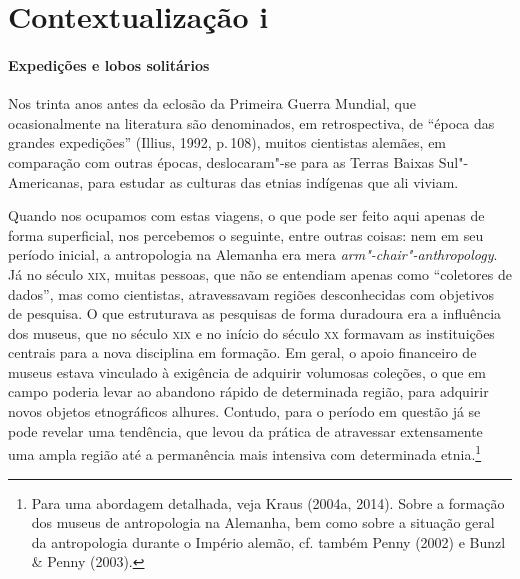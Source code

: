 \section{Contextualização i}
\paragraph{Expedições e lobos solitários} Nos trinta anos antes da eclosão da Primeira Guerra Mundial, que
ocasionalmente na literatura são denominados, em retrospectiva, de
``época das grandes expedições'' (Illius, 1992, p.\,108), muitos
cientistas alemães, em comparação com outras épocas, deslocaram"-se para
as Terras Baixas Sul"-Americanas, para estudar as culturas das etnias
indígenas que ali viviam.

Quando nos ocupamos com estas viagens, o que pode ser feito aqui apenas
de forma superficial, nos percebemos o seguinte, entre outras coisas:
nem em seu período inicial, a antropologia na Alemanha era mera
\textit{arm"-chair"-anthropology}. Já no século \textsc{xix}, muitas pessoas, que não
se entendiam apenas como ``coletores de dados'', mas como cientistas,
atravessavam regiões desconhecidas com objetivos de pesquisa. O que
estruturava as pesquisas de forma duradoura era a influência dos
museus, que no século \textsc{xix} e no início do século \textsc{xx} formavam as
instituições centrais para a nova disciplina em formação. Em geral, o
apoio financeiro de museus estava vinculado à exigência de adquirir
volumosas coleções, o que em campo poderia levar ao abandono rápido de
determinada região, para adquirir novos objetos etnográficos alhures.
Contudo, para o período em questão já se pode revelar uma tendência, que
levou da prática de atravessar extensamente uma ampla região até a
permanência mais intensiva com determinada etnia.\footnote{Para uma
  abordagem detalhada, veja Kraus (2004a, 2014). Sobre a formação dos
  museus de antropologia na Alemanha, bem como sobre a situação geral
  da antropologia durante o Império alemão, cf. também Penny (2002) e
  Bunzl \& Penny (2003).}

